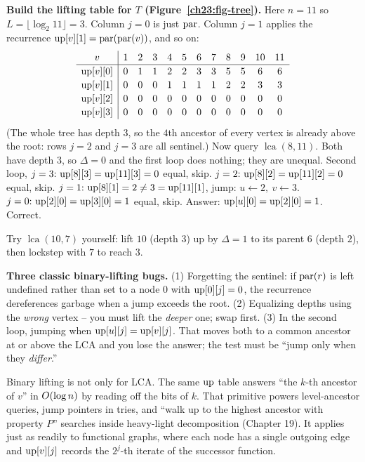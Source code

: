 \begin{labbox}
\textbf{Build the lifting table for $T$ (Figure~\ref{ch23:fig-tree}).} Here $n=11$ so
$L=\lfloor\log_2 11\rfloor = 3$. Column $j{=}0$ is just $\operatorname{par}$. Column $j{=}1$ applies the
recurrence $\mathrm{up}[v][1]=\operatorname{par}(\operatorname{par}(v))$, and so on:
\[
\renewcommand{\arraystretch}{1.15}
\begin{array}{c|ccccccccccc}
v & 1 & 2 & 3 & 4 & 5 & 6 & 7 & 8 & 9 & 10 & 11\\\hline
\up[v][0] & 0 & 1 & 1 & 2 & 2 & 3 & 3 & 5 & 5 & 6 & 6\\
\up[v][1] & 0 & 0 & 0 & 1 & 1 & 1 & 1 & 2 & 2 & 3 & 3\\
\up[v][2] & 0 & 0 & 0 & 0 & 0 & 0 & 0 & 0 & 0 & 0 & 0\\
\up[v][3] & 0 & 0 & 0 & 0 & 0 & 0 & 0 & 0 & 0 & 0 & 0
\end{array}
\]
(The whole tree has depth $3$, so the $4$th ancestor of every vertex is already above the
root: rows $j{=}2$ and $j{=}3$ are all sentinel.) Now query $\operatorname{lca}(8,11)$. Both
have depth $3$, so $\Delta=0$ and the first loop does nothing; they are unequal. Second loop,
$j=3{:}\ \mathrm{up}[8][3]=\mathrm{up}[11][3]=0$ equal, skip. $j=2{:}\ \mathrm{up}[8][2]=\mathrm{up}[11][2]=0$ equal, skip.
$j=1{:}\ \mathrm{up}[8][1]=2\neq 3=\mathrm{up}[11][1]$, jump:
$u\gets 2,\ v\gets 3$. $j=0{:}\ \mathrm{up}[2][0]=\mathrm{up}[3][0]=1$ equal, skip. Answer:
$\mathrm{up}[u][0]=\mathrm{up}[2][0]=1$. Correct.

Try $\operatorname{lca}(10,7)$ yourself: lift $10$ (depth $3$) up by $\Delta=1$ to its parent
$6$ (depth $2$), then lockstep with $7$ to reach $3$.
\end{labbox}

\begin{trapbox}
\textbf{Three classic binary-lifting bugs.} (1) Forgetting the sentinel: if $\operatorname{par}(r)$ is left
undefined rather than set to a node $0$ with $\mathrm{up}[0][j]=0$, the recurrence dereferences
garbage when a jump exceeds the root. (2) Equalizing depths using the \emph{wrong} vertex --
you must lift the \emph{deeper} one; swap first. (3) In the second loop, jumping when
$\mathrm{up}[u][j]=\mathrm{up}[v][j]$. That moves both to a common ancestor at or above the LCA and you lose
the answer; the test must be ``jump only when they \emph{differ}.''
\end{trapbox}

\begin{applicationbox}
Binary lifting is not only for LCA. The same $\mathrm{up}$ table answers ``the $k$-th ancestor of $v$'' in $O(\log n)$ by
reading off the bits of $k$. That primitive powers level-ancestor queries, jump
pointers in tries, and ``walk up to the highest ancestor with property $P$''
searches inside heavy-light decomposition (Chapter 19). It applies just as
readily to functional graphs, where each node has a single outgoing edge and
$\mathrm{up}[v][j]$ records the $2^j$-th iterate of the successor function.
\end{applicationbox}

